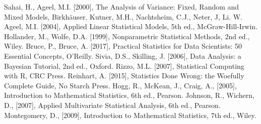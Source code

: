 \begin{thebibliography}{99}
 Sahai, H., Ageel, M.I. [2000], The Analysis of Variance: Fixed, Random and Mixed Models, Birkh\"auser.
 Kutner, M.H., Nachtsheim, C.J., Neter, J, Li. W. Ageel, M.I. [2004], Applied Linear Statistical Models, 5th ed., McGraw-Hill-Irwin. 
 Hollander, M., Wolfe, D.A. [1999], Nonparametric Statistical Methods, 2nd ed., Wiley.
 Bruce, P., Bruce, A. [2017], Practical Statistics for Data Scientists: 50 Essential Concepts, O'Reilly. 
 Sivia, D.S., Skilling, J. [2006], Data Analysis: a Bayesian Tutorial, 2nd ed., Oxford. 
 Rizzo, M.L. [2007], Statistical Computing with R, CRC Press.
 Reinhart, A. [2015], Statistics Done Wrong: the Woefully Complete Guide, No Starch Press. 
 Hogg, R., McKean, J., Craig, A., [2005], Introduction to Mathematical Statistics, 6th ed., Pearson. 
 Johnson, R., Wichern, D., [2007], Applied Multivariate Statistical Analysis, 6th ed., Pearson. 
 Montegomery, D., [2009], Introduction to Mathematical Statistics, 7th ed., Wiley.
 
 
\end{thebibliography}

